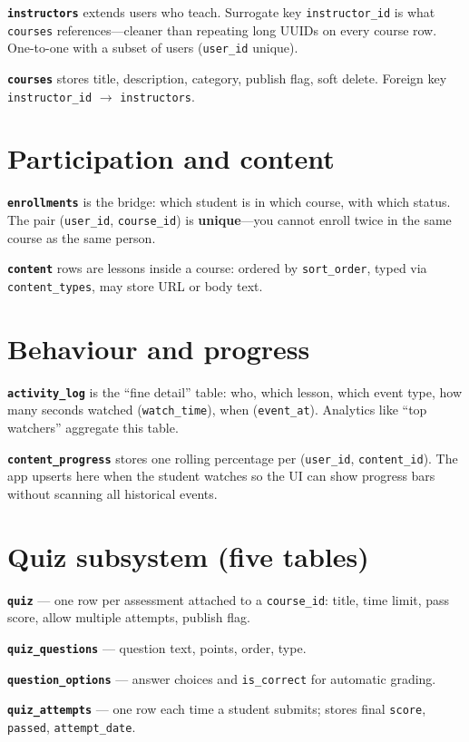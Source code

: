 \textbf{\texttt{instructors}} extends users who teach. Surrogate key \texttt{instructor\_id} is what \texttt{courses} references---cleaner than repeating long UUIDs on every course row. One-to-one with a subset of users (\texttt{user\_id} unique).

\textbf{\texttt{courses}} stores title, description, category, publish flag, soft delete. Foreign key \texttt{instructor\_id} $\rightarrow$ \texttt{instructors}.

\section{Participation and content}
\textbf{\texttt{enrollments}} is the bridge: which student is in which course, with which status. The pair (\texttt{user\_id}, \texttt{course\_id}) is \textbf{unique}---you cannot enroll twice in the same course as the same person.

\textbf{\texttt{content}} rows are lessons inside a course: ordered by \texttt{sort\_order}, typed via \texttt{content\_types}, may store URL or body text.

\section{Behaviour and progress}
\textbf{\texttt{activity\_log}} is the ``fine detail'' table: who, which lesson, which event type, how many seconds watched (\texttt{watch\_time}), when (\texttt{event\_at}). Analytics like ``top watchers'' aggregate this table.

\textbf{\texttt{content\_progress}} stores one rolling percentage per (\texttt{user\_id}, \texttt{content\_id}). The app upserts here when the student watches so the UI can show progress bars without scanning all historical events.

\section{Quiz subsystem (five tables)}
\textbf{\texttt{quiz}} --- one row per assessment attached to a \texttt{course\_id}: title, time limit, pass score, allow multiple attempts, publish flag.

\textbf{\texttt{quiz\_questions}} --- question text, points, order, type.

\textbf{\texttt{question\_options}} --- answer choices and \texttt{is\_correct} for automatic grading.

\textbf{\texttt{quiz\_attempts}} --- one row each time a student submits; stores final \texttt{score}, \texttt{passed}, \texttt{attempt\_date}.

